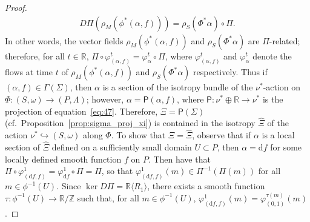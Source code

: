 \documentclass[pdftex]{sigma}
\numberwithin{equation}{section}
\newcommand{\de}{\mathrm{d}} %
\newcommand{\SM}{(S,\omega)} %
\newcommand{\PM}{(P,\Lambda)} %
\newcommand{\RR}{\mathbb{R}}
\newcommand{\ZZ}{\mathbb{Z}}
\begin{document}
\begin{proof}
 \begin{gather*}
 D \Pi(\rho_M(\phi^*(\alpha,f))) = \rho_S(\Phi^*\alpha) \circ \Pi.
 \end{gather*}
In other words, the vector f\/ields $\rho_M(\phi^*(\alpha,f))$ and $\rho_S(\Phi^*\alpha)$ are $\Pi$-related; therefore, for all $t \in \RR$, $\Pi \circ \varphi^t_{(\alpha,f)} = \varphi^t_{\alpha} \circ \Pi$, where $\varphi^t_{(\alpha,f)}$ and $\varphi^t_{\alpha}$ denote the f\/lows at time $t$ of $\rho_M(\phi^*(\alpha,f))$ and $\rho_S(\Phi^*\alpha)$ respectively. Thus if $(\alpha,f) \in \Gamma(\Sigma)$, then $\alpha$ is a section of the isotropy bundle of the $\nu^*$-action on $\Phi \colon \SM \to \PM$; however, $\alpha = \mathsf{P}(\alpha,f)$, where $\mathsf{P} \colon \nu^* \oplus \RR \to \nu^*$ is the projection of equation~\eqref{eq:47}. Therefore, $\Xi = \mathsf{P}(\Sigma)$ (cf.\ Proposition~\ref{prop:sigma_proj_xi}) is contained in the isotropy $\hat{\Xi}$ of the action $\nu^* \hookrightarrow \SM$ along $\Phi$. To show that $\Xi = \hat{\Xi}$, observe that if $\alpha$ is a local section of $\hat{\Xi}$ def\/ined on a suf\/f\/iciently small domain $U \subset P$, then $\alpha = \de f$ for some locally def\/ined smooth function $f$ on $P$. Then have that $\Pi \circ \varphi^1_{(\de f,f)} = \varphi^1_{\de f} \circ \Pi = \Pi$, so that $\varphi^1_{(\de f,f)}(m) \in \Pi^{-1}(\Pi(m))$ for all $m \in \phi^{-1}(U)$. Since $\ker D\Pi = \RR \langle R_1 \rangle$, there exists a smooth function $\tau \colon \phi^{-1}(U) \to \RR/\ZZ$ such that, for all $m \in
 \phi^{-1}(U)$, $\varphi^1_{(\de f,f)}(m) = \varphi^{\tau(m)}_{(0,1)}(m)$.


\end{proof}
\end{document}
